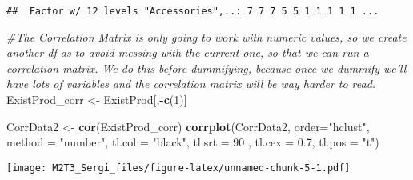 \documentclass[]{article}
\newenvironment{Shaded}{\begin{snugshade}}{\end{snugshade}}
\newcommand{\CommentTok}[1]{\textcolor[rgb]{0.56,0.35,0.01}{\textit{#1}}}
\newcommand{\DataTypeTok}[1]{\textcolor[rgb]{0.13,0.29,0.53}{#1}}
\newcommand{\DecValTok}[1]{\textcolor[rgb]{0.00,0.00,0.81}{#1}}
\newcommand{\FloatTok}[1]{\textcolor[rgb]{0.00,0.00,0.81}{#1}}
\newcommand{\KeywordTok}[1]{\textcolor[rgb]{0.13,0.29,0.53}{\textbf{#1}}}
\newcommand{\NormalTok}[1]{#1}
\newcommand{\OperatorTok}[1]{\textcolor[rgb]{0.81,0.36,0.00}{\textbf{#1}}}
\newcommand{\StringTok}[1]{\textcolor[rgb]{0.31,0.60,0.02}{#1}}
\begin{document}
\begin{Shaded}
\end{Shaded}

\begin{verbatim}
##  Factor w/ 12 levels "Accessories",..: 7 7 7 5 5 1 1 1 1 1 ...
\end{verbatim}

\begin{Shaded}
\begin{Highlighting}[]
\CommentTok{#The Correlation Matrix is only going to work with numeric values, so we create another df as to avoid messing with the current one, so that we can run a correlation matrix. We do this before dummifying, because once we dummify we'll have lots of variables and the correlation matrix will be way harder to read.}
\NormalTok{ExistProd_corr <-}\StringTok{ }\NormalTok{ExistProd[,}\OperatorTok{-}\KeywordTok{c}\NormalTok{(}\DecValTok{1}\NormalTok{)]}

\NormalTok{CorrData2 <-}\StringTok{ }\KeywordTok{cor}\NormalTok{(ExistProd_corr)}
\KeywordTok{corrplot}\NormalTok{(CorrData2, }\DataTypeTok{order=}\StringTok{"hclust"}\NormalTok{, }\DataTypeTok{method =} \StringTok{"number"}\NormalTok{,}
        \DataTypeTok{tl.col =} \StringTok{"black"}\NormalTok{, }\DataTypeTok{tl.srt =} \DecValTok{90}\NormalTok{ , }\DataTypeTok{tl.cex =} \FloatTok{0.7}\NormalTok{, }\DataTypeTok{tl.pos =} \StringTok{"t"}\NormalTok{)}
\end{Highlighting}
\end{Shaded}

\texttt{[image: M2T3\_Sergi\_files/figure-latex/unnamed-chunk-5-1.pdf]}

\begin{Shaded}
\end{Shaded}
\end{document}
